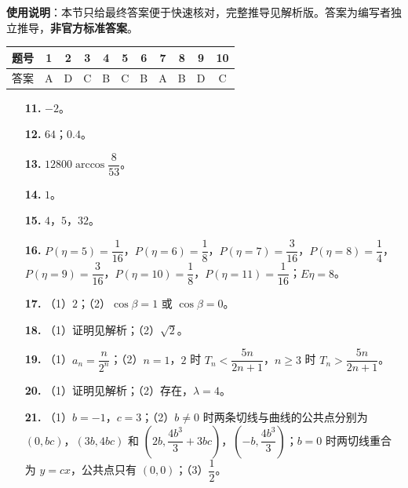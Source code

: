 
\begin{gknotice}
\textbf{使用说明}：本节只给最终答案便于快速核对，完整推导见解析版。答案为编写者独立推导，\textbf{非官方标准答案}。
\end{gknotice}

\begin{center}\begin{tabular}{ccccccccccc}
\toprule
题号 & 1 & 2 & 3 & 4 & 5 & 6 & 7 & 8 & 9 & 10 \\
\midrule
答案 & A & D & C & B & C & B & A & B & D & C \\
\bottomrule
\end{tabular}\end{center}

\begin{itemize}[leftmargin=2.6em]
  \item[\textbf{11.}] $-2$。
  \item[\textbf{12.}] $64$；$0.4$。
  \item[\textbf{13.}] $12800\arccos\dfrac{8}{53}$。
  \item[\textbf{14.}] $1$。
  \item[\textbf{15.}] $4$，$5$，$32$。
\end{itemize}

\begin{itemize}[leftmargin=2.6em]
  \item[\textbf{16.}] $P(\eta=5)=\dfrac1{16}$，$P(\eta=6)=\dfrac18$，$P(\eta=7)=\dfrac3{16}$，$P(\eta=8)=\dfrac14$，$P(\eta=9)=\dfrac3{16}$，$P(\eta=10)=\dfrac18$，$P(\eta=11)=\dfrac1{16}$；$E\eta=8$。
  \item[\textbf{17.}] （1）$2$；（2）$\cos\beta=1$ 或 $\cos\beta=0$。
  \item[\textbf{18.}] （1）证明见解析；（2）$\sqrt2$。
  \item[\textbf{19.}] （1）$a_n=\dfrac{n}{2^n}$；（2）$n=1$，$2$ 时 $T_n<\dfrac{5n}{2n+1}$，$n\geqslant3$ 时 $T_n>\dfrac{5n}{2n+1}$。
  \item[\textbf{20.}] （1）证明见解析；（2）存在，$\lambda=4$。
  \item[\textbf{21.}] （1）$b=-1$，$c=3$；（2）$b\neq0$ 时两条切线与曲线的公共点分别为 $(0,bc)$，$(3b,4bc)$ 和 $\left(2b,\dfrac{4b^3}{3}+3bc\right)$，$\left(-b,\dfrac{4b^3}{3}\right)$；$b=0$ 时两切线重合为 $y=cx$，公共点只有 $(0,0)$；（3）$\dfrac12$。
\end{itemize}
